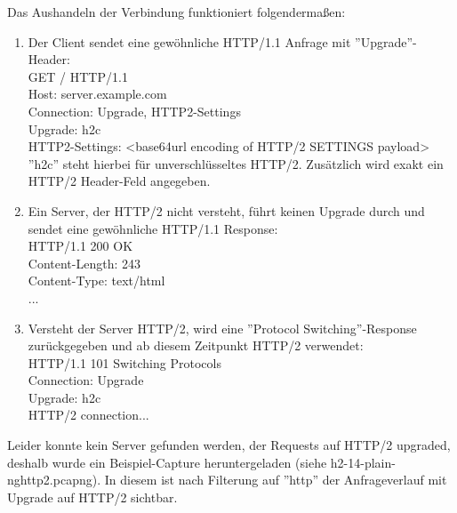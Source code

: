 \documentclass[12pt, a4paper]{report}
\begin{document}
Das Aushandeln der Verbindung funktioniert folgendermaßen:
\begin{enumerate}
	\item Der Client sendet eine gewöhnliche HTTP/1.1 Anfrage mit ''Upgrade''-Header:\\
	GET / HTTP/1.1\\
	Host: server.example.com\\
	Connection: Upgrade, HTTP2-Settings\\
	Upgrade: h2c\\
	HTTP2-Settings: <base64url encoding of HTTP/2 SETTINGS payload>\\
	''h2c'' steht hierbei für unverschlüsseltes HTTP/2. Zusätzlich wird exakt ein HTTP/2 Header-Feld angegeben.
	\item Ein Server, der HTTP/2 nicht versteht, führt keinen Upgrade durch und sendet eine gewöhnliche HTTP/1.1 Response:\\
	HTTP/1.1 200 OK\\
	Content-Length: 243\\
	Content-Type: text/html \\
	... 
	\item Versteht der Server HTTP/2, wird eine ''Protocol Switching''-Response zurückgegeben und ab diesem Zeitpunkt HTTP/2 verwendet:\\
	HTTP/1.1 101 Switching Protocols \\
	Connection: Upgrade\\
	Upgrade: h2c \\
	HTTP/2 connection...
\end{enumerate}

Leider konnte kein Server gefunden werden, der Requests auf HTTP/2 upgraded, deshalb wurde ein Beispiel-Capture heruntergeladen (siehe h2-14-plain-nghttp2.pcapng).
In diesem ist nach Filterung auf ''http'' der Anfrageverlauf mit Upgrade auf HTTP/2 sichtbar.
\end{document}
